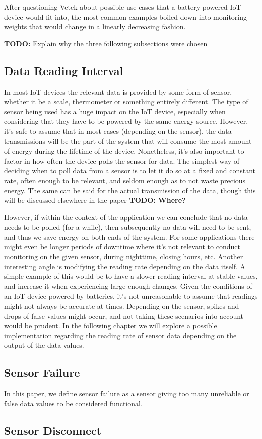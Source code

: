 After questioning Vetek about possible use cases that a battery-powered IoT device would fit into, the most common examples boiled down into monitoring weights that would change in a linearly decreasing fashion. 

\textbf{TODO:} Explain why the three following subsections were chosen

\subsection{Data Reading Interval}
In most IoT devices the relevant data is provided by some form of sensor, whether it be a scale, thermometer or something entirely different. The type of sensor being used has a huge impact on the IoT device, especially when considering that they have to be powered by the same energy source. However, it's safe to assume that in most cases (depending on the sensor), the data transmissions will be the part of the system that will consume the most amount of energy during the lifetime of the device. Nonetheless, it's also important to factor in how often the device polls the sensor for data. The simplest way of deciding when to poll data from a sensor is to let it do so at a fixed and constant rate, often enough to be relevant, and seldom enough as to not waste precious energy. The same can be said for the actual transmission of the data, though this will be discussed elsewhere in the paper \textbf{TODO: Where?}

However, if within the context of the application we can conclude that no data needs to be polled (for a while), then subsequently no data will need to be sent, and thus we save energy on both ends of the system. For some applications there might even be longer periods of downtime where it's not relevant to conduct monitoring on the given sensor, \eg during nighttime, closing hours, etc. Another interesting angle is modifying the reading rate depending on the data itself. A simple example of this would be to have a slower reading interval at stable values, and increase it when experiencing large enough changes. Given the conditions of an IoT device powered by batteries, it's not unreasonable to assume that readings might not always be accurate at times. Depending on the sensor, spikes and drops of false values might occur, and not taking these scenarios into account would be prudent. In the following chapter we will explore a possible implementation regarding the reading rate of sensor data depending on the output of the data values.

\subsection{Sensor Failure}

In this paper, we define sensor failure as a sensor giving too many unreliable or false data values to be considered functional. 

\subsection{Sensor Disconnect}
